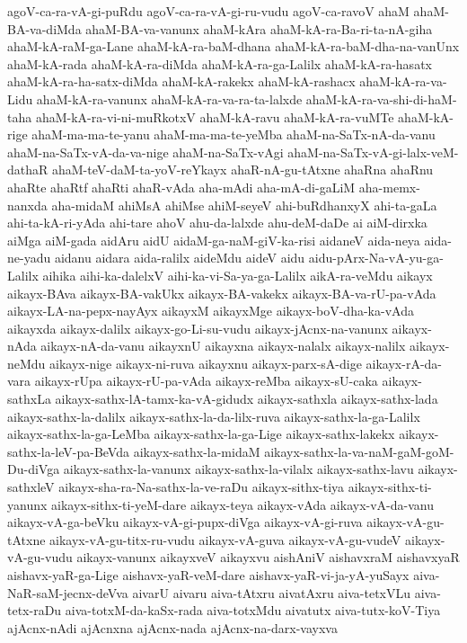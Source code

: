{agoV-ca-ra-vA-gi-puRdu
agoV-ca-ra-vA-gi-ru-vudu
agoV-ca-ravoV
ahaM
ahaM-BA-va-diMda
ahaM-BA-va-vanunx
ahaM-kAra
ahaM-kA-ra-Ba-ri-ta-nA-giha
ahaM-kA-raM-ga-Lane
ahaM-kA-ra-baM-dhana
ahaM-kA-ra-baM-dha-na-vanUnx
ahaM-kA-rada
ahaM-kA-ra-diMda
ahaM-kA-ra-ga-Lalilx
ahaM-kA-ra-hasatx
ahaM-kA-ra-ha-satx-diMda
ahaM-kA-rakekx
ahaM-kA-rashacx
ahaM-kA-ra-va-Lidu
ahaM-kA-ra-vanunx
ahaM-kA-ra-va-ra-ta-lalxde
ahaM-kA-ra-va-shi-di-haM-taha
ahaM-kA-ra-vi-ni-muRkotxV
ahaM-kA-ravu
ahaM-kA-ra-vuMTe
ahaM-kA-rige
ahaM-ma-ma-te-yanu
ahaM-ma-ma-te-yeMba
ahaM-na-SaTx-nA-da-vanu
ahaM-na-SaTx-vA-da-va-nige
ahaM-na-SaTx-vAgi
ahaM-na-SaTx-vA-gi-lalx-veM-dathaR
ahaM-teV-daM-ta-yoV-reYkayx
ahaR-nA-gu-tAtxne
ahaRna
ahaRnu
ahaRte
ahaRtf
ahaRti
ahaR-vAda
aha-mAdi
aha-mA-di-gaLiM
aha-memx-nanxda
aha-midaM
ahiMsA
ahiMse
ahiM-seyeV
ahi-buRdhanxyX
ahi-ta-gaLa
ahi-ta-kA-ri-yAda
ahi-tare
ahoV
ahu-da-lalxde
ahu-deM-daDe
ai
aiM-dirxka
aiMga
aiM-gada
aidAru
aidU
aidaM-ga-naM-giV-ka-risi
aidaneV
aida-neya
aida-ne-yadu
aidanu
aidara
aida-ralilx
aideMdu
aideV
aidu
aidu-pArx-Na-vA-yu-ga-Lalilx
aihika
aihi-ka-dalelxV
aihi-ka-vi-Sa-ya-ga-Lalilx
aikA-ra-veMdu
aikayx
aikayx-BAva
aikayx-BA-vakUkx
aikayx-BA-vakekx
aikayx-BA-va-rU-pa-vAda
aikayx-LA-na-pepx-nayAyx
aikayxM
aikayxMge
aikayx-boV-dha-ka-vAda
aikayxda
aikayx-dalilx
aikayx-go-Li-su-vudu
aikayx-jAcnx-na-vanunx
aikayx-nAda
aikayx-nA-da-vanu
aikayxnU
aikayxna
aikayx-nalalx
aikayx-nalilx
aikayx-neMdu
aikayx-nige
aikayx-ni-ruva
aikayxnu
aikayx-parx-sA-dige
aikayx-rA-da-vara
aikayx-rUpa
aikayx-rU-pa-vAda
aikayx-reMba
aikayx-sU-caka
aikayx-sathxLa
aikayx-sathx-lA-tamx-ka-vA-gidudx
aikayx-sathxla
aikayx-sathx-lada
aikayx-sathx-la-dalilx
aikayx-sathx-la-da-lilx-ruva
aikayx-sathx-la-ga-Lalilx
aikayx-sathx-la-ga-LeMba
aikayx-sathx-la-ga-Lige
aikayx-sathx-lakekx
aikayx-sathx-la-leV-pa-BeVda
aikayx-sathx-la-midaM
aikayx-sathx-la-va-naM-gaM-goM-Du-diVga
aikayx-sathx-la-vanunx
aikayx-sathx-la-vilalx
aikayx-sathx-lavu
aikayx-sathxleV
aikayx-sha-ra-Na-sathx-la-ve-raDu
aikayx-sithx-tiya
aikayx-sithx-ti-yanunx
aikayx-sithx-ti-yeM-dare
aikayx-teya
aikayx-vAda
aikayx-vA-da-vanu
aikayx-vA-ga-beVku
aikayx-vA-gi-pupx-diVga
aikayx-vA-gi-ruva
aikayx-vA-gu-tAtxne
aikayx-vA-gu-titx-ru-vudu
aikayx-vA-guva
aikayx-vA-gu-vudeV
aikayx-vA-gu-vudu
aikayx-vanunx
aikayxveV
aikayxvu
aishAniV
aishavxraM
aishavxyaR
aishavx-yaR-ga-Lige
aishavx-yaR-veM-dare
aishavx-yaR-vi-ja-yA-yuSayx
aiva-NaR-saM-jecnx-deVva
aivarU
aivaru
aiva-tAtxru
aivatAxru
aiva-tetxVLu
aiva-tetx-raDu
aiva-totxM-da-kaSx-rada
aiva-totxMdu
aivatutx
aiva-tutx-koV-Tiya
ajAcnx-nAdi
ajAcnxna
ajAcnx-nada
ajAcnx-na-darx-vayxva
}
